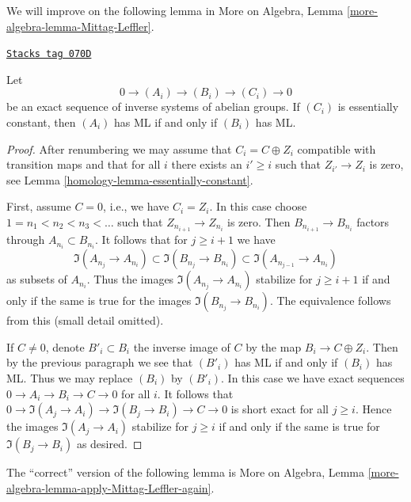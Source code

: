We will improve on the following lemma in
More on Algebra, Lemma \ref{more-algebra-lemma-Mittag-Leffler}.

\begin{lemma}
\label{homology-lemma-exact-sequence-ML}
\href{https://stacks.math.columbia.edu/tag/070D}{\texttt{Stacks tag 070D}}

Let
$$
0 \to (A_i) \to (B_i) \to (C_i) \to 0
$$
be an exact sequence of inverse systems of abelian groups.
If $(C_i)$ is essentially constant, then $(A_i)$ has ML
if and only if $(B_i)$ has ML.
\end{lemma}

\begin{proof}

After renumbering we may assume that $C_i = C \oplus Z_i$ compatible with
transition maps and that for all $i$ there exists an $i' \geq i$ such that
$Z_{i'} \to Z_i$ is zero, see Lemma \ref{homology-lemma-essentially-constant}.

\medskip\noindent
First, assume $C = 0$, i.e., we have $C_i = Z_i$.
In this case choose $1 = n_1 < n_2 < n_3 < \ldots$
such that $Z_{n_{i + 1}} \to Z_{n_i}$ is zero.
Then $B_{n_{i + 1}} \to B_{n_i}$ factors through $A_{n_i} \subset B_{n_i}$.
It follows that for $j \geq i + 1$ we have
$$
\Im(A_{n_j} \to A_{n_i}) \subset \Im(B_{n_j} \to B_{n_i}) \subset
\Im(A_{n_{j - 1}} \to A_{n_i})
$$
as subsets of $A_{n_i}$.
Thus the images $\Im(A_{n_j} \to A_{n_i})$ stabilize for $j \geq i + 1$
if and only if the same is true for the images $\Im(B_{n_j} \to B_{n_i})$.
The equivalence follows from this (small detail omitted).

\medskip\noindent
If $C \not = 0$, denote $B'_i \subset B_i$ the inverse image
of $C$ by the map $B_i \to C \oplus Z_i$. Then by the previous
paragraph we see that $(B'_i)$ has ML if and only if $(B_i)$
has ML. Thus we may replace $(B_i)$ by $(B'_i)$.
In this case we have exact sequences $0 \to A_i \to B_i \to C \to 0$
for all $i$. It follows that
$0 \to \Im(A_j \to A_i) \to \Im(B_j \to B_i) \to C \to 0$
is short exact for all $j \geq i$. Hence the images
$\Im(A_j \to A_i)$ stabilize for $j \geq i$
if and only if the same is true for $\Im(B_j \to B_i)$
as desired.
\end{proof}

The ``correct'' version of the following lemma is
More on Algebra, Lemma \ref{more-algebra-lemma-apply-Mittag-Leffler-again}.

